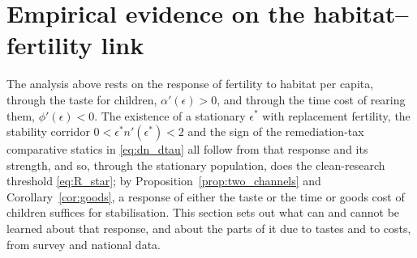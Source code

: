 \documentclass[11pt]{article}
\begin{document}
\section{Empirical evidence on the habitat--fertility link}
\label{sec:empirics}

The analysis above rests on the response of fertility to habitat per capita, through the taste for
children, $\alpha'(\epsilon)>0$, and through the time cost of rearing them, $\phi'(\epsilon)<0$. The existence of a stationary $\epsilon^\ast$ with replacement fertility, the stability
corridor $0<\epsilon^\ast n'(\epsilon^\ast)<2$ and the sign of the remediation-tax comparative
statics in \eqref{eq:dn_dtau} all follow from that response and its strength, and so, through the
stationary population, does the clean-research threshold \eqref{eq:R_star}; by
Proposition~\ref{prop:two_channels} and Corollary~\ref{cor:goods}, a response of either the taste or the time or goods cost of children suffices for stabilisation. This section sets out what can and cannot be learned about
that response, and about the parts of it due to tastes and to costs, from survey and national data.
\end{document}
